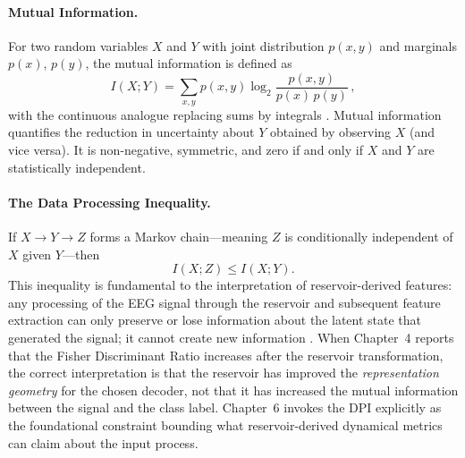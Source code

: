 \paragraph{Mutual Information.}
For two random variables $X$ and $Y$ with joint distribution $p(x,y)$ and marginals $p(x)$, $p(y)$, the mutual information is defined as
\begin{equation}
    I(X; Y) = \sum_{x,y} p(x,y) \log_2 \frac{p(x,y)}{p(x)\,p(y)}\,,
    \label{eq:mutual_info}
\end{equation}
with the continuous analogue replacing sums by integrals \cite{cover_elements_2006}. Mutual information quantifies the reduction in uncertainty about $Y$ obtained by observing $X$ (and vice versa). It is non-negative, symmetric, and zero if and only if $X$ and $Y$ are statistically independent.

\paragraph{The Data Processing Inequality.}
If $X \to Y \to Z$ forms a Markov chain---meaning $Z$ is conditionally independent of $X$ given $Y$---then
\begin{equation}
    I(X; Z) \leq I(X; Y).
    \label{eq:dpi}
\end{equation}
This inequality is fundamental to the interpretation of reservoir-derived features: any processing of the EEG signal through the reservoir and subsequent feature extraction can only preserve or lose information about the latent state that generated the signal; it cannot create new information \cite{cover_elements_2006}. When Chapter~4 reports that the Fisher Discriminant Ratio increases after the reservoir transformation, the correct interpretation is that the reservoir has improved the \emph{representation geometry} for the chosen decoder, not that it has increased the mutual information between the signal and the class label. Chapter~6 invokes the DPI explicitly as the foundational constraint bounding what reservoir-derived dynamical metrics can claim about the input process.

